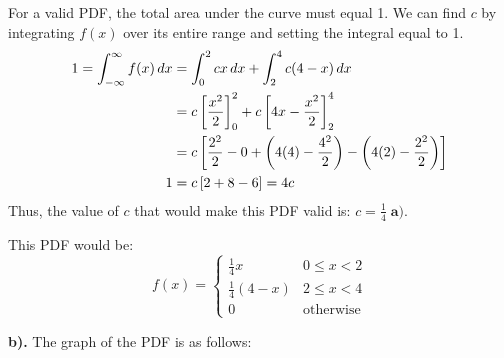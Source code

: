 \documentclass[a4paper, 10pt]{article}
\begin{document}
\begin{solution}
	For a valid PDF, the total area under the curve must equal 1. We can find \( c \) by integrating \( f(x) \) over its entire range and setting the integral equal to 1.
	\begin{align*}
		1 = \int_{-\infty}^{\infty} f(x)\,dx & = \int_{0}^{2} cx\,dx + \int_{2}^{4} c(4 - x)\,dx                                               \\
		                                     & = c \left[\frac{x^2}{2}\right]_{0}^{2} + c \left[4x - \frac{x^2}{2}\right]_{2}^{4}                \\
		                                     & = c \left[\frac{2^2}{2} - 0 + \left(4(4) - \frac{4^2}{2}\right) - \left(4(2) - \frac{2^2}{2}\right)\right] \\
		1                                    & = c \left[2 + 8 - 6\right] = 4c
	\end{align*}
	Thus, the value of \( c \) that would make this PDF valid is: \( \boxed{c = \frac{1}{4}} \; \textbf{a).} \)

	This PDF would be:
	\[
		f(x) = \begin{cases}
			\tfrac{1}{4}x       & 0 \leq x < 2     \\
			\tfrac{1}{4}(4 - x) & 2 \leq x < 4     \\
			0                   & \text{otherwise}
		\end{cases}
	\]

	\textbf{b).} The graph of the PDF is as follows:
	\begin{center}
	\end{center}
\end{solution}
\end{document}
